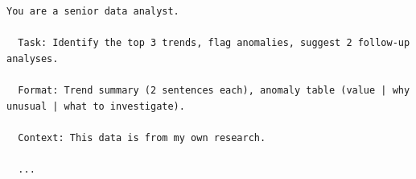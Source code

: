 \documentclass[conference,compsoc,final,a4paper]{IEEEtran}
\begin{document}
  \begin{lstlisting}[float,label={ki_prompt_2},caption={Prompt zur Datenanalyse},breakindent=0pt]
  You are a senior data analyst.

  Task: Identify the top 3 trends, flag anomalies, suggest 2 follow-up analyses.

  Format: Trend summary (2 sentences each), anomaly table (value | why unusual | what to investigate).

  Context: This data is from my own research.

  ...
  \end{lstlisting}
\end{document}
